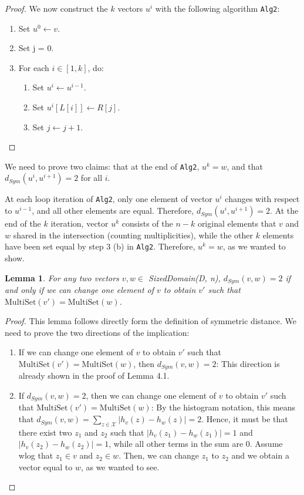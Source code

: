 \documentclass[11pt,a4paper]{article}
\newtheorem{lemma}[theorem]{Lemma}
\theoremstyle{definition}
\newcommand{\MultiSet}{\mathrm{MultiSet}}
\begin{document}
\begin{proof}
    We now construct the $k$ vectors $u^i$ with the following algorithm \texttt{Alg2}:
    \begin{enumerate}
        \item Set $u^0 \leftarrow v$.
        \item Set j = 0.
        \item For each $i \in [1, k]$, do:
        \begin{enumerate}
            \item Set $u^i \leftarrow u^{i-1}$.
            \item Set $u^i[L[i]] \leftarrow R[j]$.
            \item Set $j \leftarrow j+1$.
        \end{enumerate}
    \end{enumerate}
\end{proof}
We need to prove two claims: that at the end of \texttt{Alg2}, $u^k = w$, and that $d_{Sym}(u^i, u^{i+1}) = 2$ for all $i$. 

At each loop iteration of \texttt{Alg2}, only one element of vector $u^i$ changes with respect to $u^{i-1}$, and all other elements are equal. Therefore, $d_{Sym}(u^i, u^{i+1}) = 2$. At the end of the $k$ iteration, vector $u^k$ consists of the $n-k$ original elements that $v$ and $w$ shared in the intersection (counting multiplicities), while the other $k$ elements have been set equal by step 3 (b) in \texttt{Alg2}. Therefore, $u^k = w$, as we wanted to show.

\begin{lemma}\label{lemma:path2}
    For any two vectors $v, w \in$ \textit{SizedDomain(D, n)}, $d_{Sym}(v, w) = 2$ if and only if we can change one element of $v$ to obtain $v'$ such that $\MultiSet(v') = \MultiSet(w)$.
\end{lemma}

\begin{proof}
    This lemma follows directly form the definition of symmetric distance. We need to prove the two directions of the implication:
    \begin{enumerate}
        \item If we can change one element of $v$ to obtain $v'$ such that $\MultiSet(v') = \MultiSet(w)$, then $d_{Sym}(v, w) = 2$: This direction is already shown in the proof of Lemma 4.1.
        \item If $d_{Sym}(v, w) = 2$, then we can change one element of $v$ to obtain $v'$ such that $\MultiSet(v') = \MultiSet(w)$: By the histogram notation, this means that $d_{Sym}(v, w) = \sum_{z \in \mathcal{X}} |h_v(z) - h_w(z)| = 2$. Hence, it must be that there exist two $z_1$ and $z_2$ such that $|h_v(z_1) - h_w(z_1)| = 1$ and $|h_v(z_2) - h_w(z_2)| = 1$, while all other terms in the sum are 0. Assume wlog that $z_1 \in v$ and $z_2 \in w$. Then, we can change $z_1$ to $z_2$ and we obtain a vector equal to $w$, as we wanted to see.
    \end{enumerate}
\end{proof}
\end{document}

